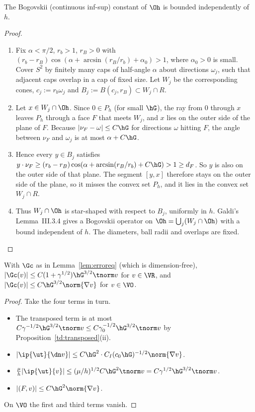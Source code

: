 \begin{lemma}\label{td:bog}
The Bogovskii (continuous inf-sup) constant of $\Oh$ is bounded independently of $h$.
\end{lemma}

\begin{proof}
\begin{enumerate}
\item Fix $\alpha<\pi/2$, $r_b>1$, $r_B>0$ with $(r_b-r_B)\cos(\alpha+\arcsin(r_B/r_b)+\alpha_0)>1$, where $\alpha_0>0$ is small. Cover $S^2$ by finitely many caps of half-angle $\alpha$ about directions $\omega_j$, such that adjacent caps overlap in a cap of fixed size. Let $W_j$ be the corresponding cones, $c_j:=r_b\omega_j$ and $B_j:=B(c_j,r_B)\subset W_j\cap R$.
\item Let $x\in W_j\cap\Oh$. Since $0\in P_h$ (for small $\hG$), the ray from $0$ through $x$ leaves $P_h$ through a face $F$ that meets $W_j$, and $x$ lies on the outer side of the plane of $F$. Because $|\nu_F-\omega|\le C\hG$ for directions $\omega$ hitting $F$, the angle between $\nu_F$ and $\omega_j$ is at most $\alpha+C\hG$.
\item Hence every $y\in B_j$ satisfies $y\cdot\nu_F\ge(r_b-r_B)\cos(\alpha+\arcsin(r_B/r_b)+C\hG)>1\ge d_F$. So $y$ is also on the outer side of that plane. The segment $[y,x]$ therefore stays on the outer side of the plane, so it misses the convex set $P_h$, and it lies in the convex set $W_j\cap R$.
\item Thus $W_j\cap\Oh$ is star-shaped with respect to $B_j$, uniformly in $h$. Galdi's Lemma~III.3.4 \cite{Galdi} gives a Bogovskii operator on $\Oh=\bigcup_j(W_j\cap\Oh)$ with a bound independent of $h$. The diameters, ball radii and overlaps are fixed.\qedhere
\end{enumerate}
\end{proof}

\begin{lemma}\label{td:G}
With $\Gc$ as in Lemma~\ref{lem:erroreq} (which is dimension-free), $|\Gc(v)|\le C(1+\gamma^{1/2})\hG^{3/2}\tnorm v$ for $v\in\VR$, and $|\Gc(v)|\le C\hG^{3/2}\norm{\nabla v}$ for $v\in\VO$.
\end{lemma}

\begin{proof}
Take the four terms in turn.
\begin{itemize}
\item The transposed term is at most $C\gamma^{-1/2}\hG^{3/2}\tnorm v\le C\gamma_0^{-1/2}\hG^{3/2}\tnorm v$ by Proposition~\ref{td:transposed}(ii).
\item $|\ip{\ut}{\dn v}|\le C\hG^2\cdot C_I(c_0\hG)^{-1/2}\norm{\nabla v}$.
\item $\frac\mu h|\ip{\ut}{v}|\le(\mu/h)^{1/2}C\hG^2\tnorm v=C\gamma^{1/2}\hG^{3/2}\tnorm v$.
\item $|(F,v)|\le C\hG^2\norm{\nabla v}$.
\end{itemize}
On $\VO$ the first and third terms vanish.
\end{proof}

